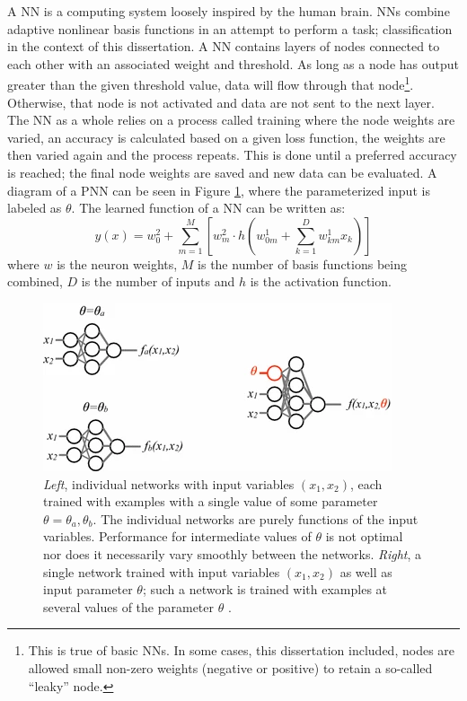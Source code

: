 		A \gls{NN} is a computing system loosely inspired by the human brain. NNs combine adaptive nonlinear basis functions in an attempt to perform a task; classification in the context of this dissertation. A NN contains layers of nodes connected to each other with an associated weight and threshold. As long as a node has output greater than the given threshold value, data will flow through that node\footnote{This is true of basic \glspl{NN}. In some cases, this dissertation included, nodes are allowed small non-zero weights (negative or positive) to retain a so-called ``leaky'' node.}. Otherwise, that node is not activated and data are not sent to the next layer. The NN as a whole relies on a process called training where the node weights are varied, an accuracy is calculated based on a given loss function, the weights are then varied again and the process repeats. This is done until a preferred accuracy is reached; the final node weights are saved and new data can be evaluated. A diagram of a \gls{PNN} can be seen in Figure \ref{fig:PNN-diagram}, where the parameterized input is labeled as $\theta$. The learned function of a NN can be written as:
		\begin{equation}
		y(x) = w_{0}^{2} + \sum^{M}_{m=1}[ w^{2}_{m} \cdot h (w_{0m}^{1} + \sum^{D}_{k=1} w^{1}_{km} x_{k}  )]
		\end{equation}
		where $w$ is the neuron weights, $M$ is the number of basis functions being combined, $D$ is the number of inputs and $h$ is the activation function.

		\begin{figure}	
			\begin{center}
				\includegraphics[width=.6\textwidth,keepaspectratio=true]{chapters/chapter6_HPlus/images/PNN_Diagram.png}
			\end{center}
			\caption{\textit{Left}, individual networks with input variables $(x_{1},x_{2})$, each trained with examples with a single value of some parameter $\theta = \theta_{a}, \theta_{b}$. The individual networks are purely functions of the input variables. Performance for intermediate values of $\theta$ is not optimal nor does it necessarily vary smoothly between the networks. \textit{Right}, a single network trained with input variables $(x_{1},x_{2})$ as well as input parameter $\theta$; such a network is trained with examples at several values of the parameter $\theta$ \cite{PNN}.}
			\label{fig:PNN-diagram}
		\end{figure}	

